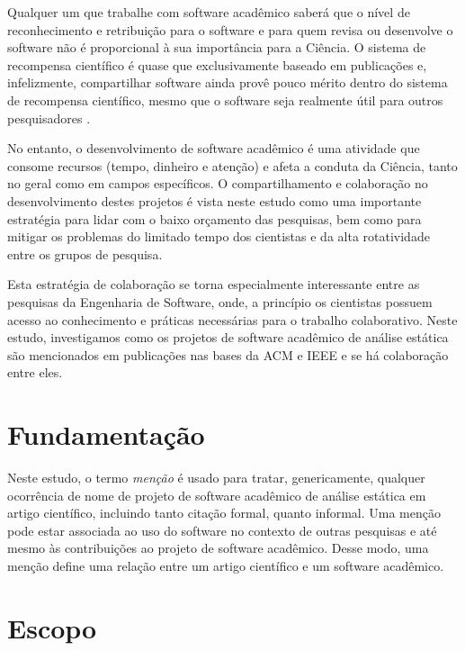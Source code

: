 Qualquer um que trabalhe com software acadêmico saberá que o nível de
reconhecimento e retribuição para o software e para quem revisa ou desenvolve o
software não é proporcional à sua importância para a Ciência. O sistema de
recompensa científico é quase que exclusivamente baseado em publicações e,
infelizmente, compartilhar software ainda provê pouco mérito dentro do sistema
de recompensa científico, mesmo que o software seja realmente útil para outros
pesquisadores \cite{goble2014better}.

No entanto, o desenvolvimento de software acadêmico é uma atividade que consome recursos
(tempo, dinheiro e atenção) e afeta a conduta da Ciência, tanto no geral como
em campos específicos.
O compartilhamento e colaboração no desenvolvimento destes projetos é vista
neste estudo como uma importante estratégia para lidar com o baixo orçamento
das pesquisas, bem como para mitigar os problemas do limitado tempo dos
cientistas e da alta rotatividade entre os grupos de pesquisa.

Esta estratégia de colaboração se torna especialmente interessante entre as
pesquisas da Engenharia de Software, onde, a princípio os cientistas possuem
acesso ao conhecimento e práticas necessárias para o trabalho colaborativo.
Neste estudo, investigamos como os projetos de software acadêmico
de análise estática são mencionados em publicações nas bases da ACM e IEEE e se
há colaboração entre eles.


\section{Fundamentação} \label{estudo2:fundamentacao}

Neste estudo,
o termo \textit{menção} é usado para tratar, genericamente, qualquer ocorrência de
nome de projeto de software acadêmico de análise estática em artigo científico,
incluindo tanto citação formal, quanto informal.
Uma menção pode estar associada ao uso do software no contexto de outras pesquisas
e até mesmo às contribuições ao projeto de software acadêmico.
Desse modo, uma menção define uma relação entre um artigo científico e 
um software acadêmico.


\section{Escopo} \label{estudo2:escopo} %

